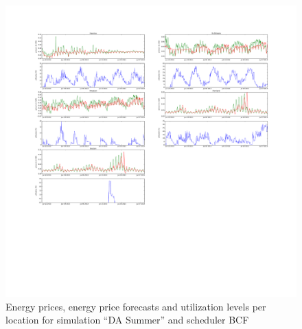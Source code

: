 \begin{figure}[htbp]
	\centering
	\vspace*{-0.6in}
	\hspace*{-1.9in}
		\includegraphics[width=1.60\textwidth]{figures/appendix_simulation_results/DA_Summer_scenario_2.pdf}
	\vspace*{-2.8in}
	\caption{Energy prices, energy price forecasts and utilization levels per location for simulation ``DA Summer'' and scheduler BCF}
	\label{fig:app_DA_Summer_scenario_2}
\end{figure}

